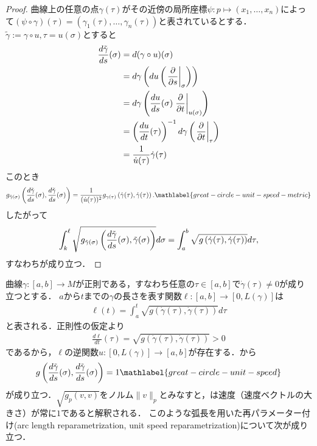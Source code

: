 \documentclass{ltjsarticle}
\begin{document}
\begin{proof}
曲線上の任意の点\(\gamma(\tau)\)がその近傍の局所座標\(\psi \colon p \mapsto (x_1, \ldots, x_n)\)によって\((\psi \circ \gamma)(\tau) = (\gamma_1(\tau), \ldots, \gamma_n(\tau))\)と表されているとする．
\(\tilde{\gamma} := \gamma \circ u, \tau = u(\sigma)\)とすると
\begin{align*}
    \frac{d\tilde{\gamma}}{ds}(\sigma)
    &= d(\gamma \circ u)(\sigma) \\
    &= d\gamma \left(du \left(\left.\frac{\partial}{\partial s}\right\lvert_{\sigma}\right) \right) \\
    &= d\gamma \left(\frac{du}{ds}(\sigma) \left.\frac{\partial}{\partial t}\right\lvert_{u(\sigma)} \right) \\
    &= \left(\frac{du}{dt}(\tau) \right)^{-1} d\gamma\left(\left.\frac{\partial}{\partial t}\right\lvert_{\tau}\right) \\
    &= \frac{1}{\dot{u}(\tau)} \dot{\gamma}(\tau)
\end{align*}
このとき
\begin{align}
    g_{\tilde{\gamma}(\sigma)}\left(\frac{d\tilde{\gamma}}{ds}(\sigma), \frac{d\tilde{\gamma}}{ds}(\sigma)\right)
    = \frac{1}{(\dot{u}(\tau))^2}
    g_{\gamma(\tau)}\left(\dot{\gamma}(\tau), \dot{\gamma}(\tau)\right).
    \mathlabel{great-circle-unit-speed-metric}
\end{align}
したがって
\begin{align*}
    \int_{k}^{\ell} \sqrt{%
        g_{\tilde{\gamma}(\sigma)}\left(\frac{d\tilde{\gamma}}{ds}(\sigma), \tilde{\gamma}(\sigma)\right)
    } d\sigma
    = \int_{a}^{b} \sqrt{%
        g\left(\dot{\gamma}(\tau), \dot{\gamma}(\tau)\right)
    } d\tau,
\end{align*}
すなわちが成り立つ．
\end{proof}

曲線\(\gamma \colon [a, b] \to M\)が正則である，すなわち任意の\(\tau \in [a, b]\)で\(\dot{\gamma}(\tau) \neq 0\)が成り立つとする．
\(a\)から\(t\)までの\(\gamma\)の長さを表す関数\(\ell \colon [a, b] \to [0, L(\gamma)]\)は
\begin{align*}
    \ell(t) = \int_{a}^{t} \sqrt{g(\dot{\gamma}(\tau), \dot{\gamma}(\tau))} d \tau
\end{align*}
と表される．正則性の仮定より
\begin{align*}
    \frac{d\ell}{dt}(\tau) = \sqrt{g(\dot{\gamma}(\tau), \dot{\gamma}(\tau))} > 0
\end{align*}
であるから，\(\ell\)の逆関数\(u \colon [0, L(\gamma)] \to [a, b]\)が存在する．から
\begin{align}
    g\left(\frac{d\tilde{\gamma}}{ds}(\sigma), \frac{d\tilde{\gamma}}{ds}(\sigma)\right) = 1
    \mathlabel{great-circle-unit-speed}
\end{align}
が成り立つ．\(\sqrt{g_p(v, v)}\)をノルム\(\lVert v \rVert_p\)とみなすと，は速度（速度ベクトルの大きさ）が常に\(1\)であると解釈される．
このような弧長を用いた再パラメーター付け(arc length reparametrization, unit speed reparametrization)について次が成り立つ．
\end{document}
